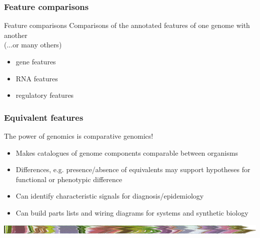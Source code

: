 
\begin{frame}
  \frametitle{Feature comparisons}
    \begin{alertblock}{Feature comparisons}
      Comparisons of the annotated features of one genome with another \\
      ($\ldots$or many others)
      \begin{itemize}
        \item gene features
        \item RNA features
        \item regulatory features
      \end{itemize}
    \end{alertblock}
\end{frame}

\begin{frame}
  \frametitle{Equivalent features}
  \begin{block}{The power of genomics is comparative genomics!}
    \begin{itemize}
      \item Makes catalogues of genome components comparable between organisms
      \item \textcolor{hutton_blue}{Differences, e.g. presence/absence of equivalents may support hypotheses for functional or phenotypic difference}
      \item \textcolor{hutton_green}{Can identify characteristic signals for diagnosis/epidemiology}
      \item \textcolor{hutton_purple}{Can build parts lists and wiring diagrams for systems and synthetic biology}
    \end{itemize}
  \end{block}
  \begin{center}
    \includegraphics[width=1\textwidth]{images/collinear_zeae}  
  \end{center}  
\end{frame}


